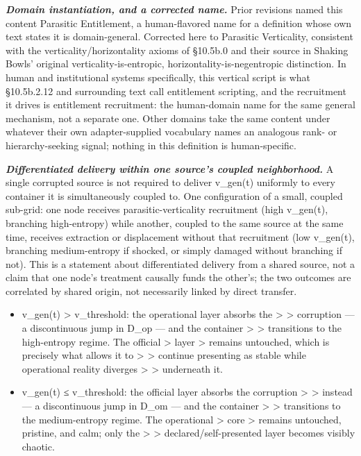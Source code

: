\documentclass[
]{article}
\begin{document}
\emph{\textbf{Domain instantiation, and a corrected name.}} Prior
revisions named this content Parasitic Entitlement, a human-flavored
name for a definition whose own text states it is domain-general.
Corrected here to Parasitic Verticality, consistent with the
verticality/horizontality axioms of §10.5b.0 and their source in
Shaking Bowls' original verticality-is-entropic, horizontality-is-negentropic
distinction. In human and institutional systems specifically, this
vertical script is what §10.5b.2.12 and surrounding text call
entitlement scripting, and the recruitment it drives is entitlement
recruitment: the human-domain name for the same general mechanism, not a
separate one. Other domains take the same content under whatever their
own adapter-supplied vocabulary names an analogous rank- or
hierarchy-seeking signal; nothing in this definition is human-specific.

\emph{\textbf{Differentiated delivery within one source's coupled
neighborhood.}} A single corrupted source is not required to deliver
v\_gen(t) uniformly to every container it is simultaneously coupled to.
One configuration of a small, coupled sub-grid: one node receives
parasitic-verticality recruitment (high v\_gen(t), branching
high-entropy) while another, coupled to the same source at the same
time, receives extraction or displacement without that recruitment (low
v\_gen(t), branching medium-entropy if shocked, or simply damaged
without branching if not). This is a statement about differentiated
delivery from a shared source, not a claim that one node's treatment
causally funds the other's; the two outcomes are correlated by shared
origin, not necessarily linked by direct transfer.

\begin{itemize}
\item
  v\_gen(t) \textgreater{} v\_threshold: the operational layer absorbs
  the \textgreater{} \textgreater{} corruption --- a discontinuous jump
  in D\_op --- and the container \textgreater{} \textgreater{}
  transitions to the high-entropy regime. The official \textgreater{}
  layer \textgreater{} remains untouched, which is precisely what allows
  it to \textgreater{} \textgreater{} continue presenting as stable
  while operational reality diverges \textgreater{} \textgreater{}
  underneath it.
\item
  v\_gen(t) ≤ v\_threshold: the official layer absorbs the corruption
  \textgreater{} \textgreater{} instead --- a discontinuous jump in
  D\_om --- and the container \textgreater{} \textgreater{} transitions
  to the medium-entropy regime. The operational \textgreater{} core
  \textgreater{} remains untouched, pristine, and calm; only the
  \textgreater{} \textgreater{} declared/self-presented layer becomes
  visibly chaotic.
\end{itemize}
\end{document}
